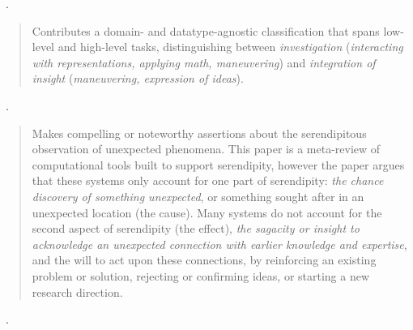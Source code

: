 \begin{sloppypar}
~\cite{Springmeyer1992}. \end{sloppypar}

\begin{quotation}
    Contributes a domain- and datatype-agnostic classification that spans low-level and high-level tasks, distinguishing between {\it investigation} ({\it interacting with representations, applying math, maneuvering}) and {\it integration of insight} ({\it maneuvering, expression of ideas}).
\end{quotation}

\begin{sloppypar}
~\cite{Andre2009}. \end{sloppypar}

\begin{quotation}
    \begin{sloppypar}
    Makes compelling or noteworthy assertions about the serendipitous observation of unexpected phenomena. 
    This paper is a meta-review of computational tools built to support serendipity, however the paper argues that these systems only account for one part of serendipity: {\it the chance discovery of something unexpected}, or something sought after in an unexpected location (the cause). 
    Many systems do not account for the second aspect of serendipity (the effect), {\it the sagacity or insight to acknowledge an unexpected connection with earlier knowledge and expertise}, and the will to act upon these connections, by reinforcing an existing problem or solution, rejecting or confirming ideas, or starting a new research direction.
    \end{sloppypar}
\end{quotation}

\begin{sloppypar}
~\cite{North2006}. \end{sloppypar}

